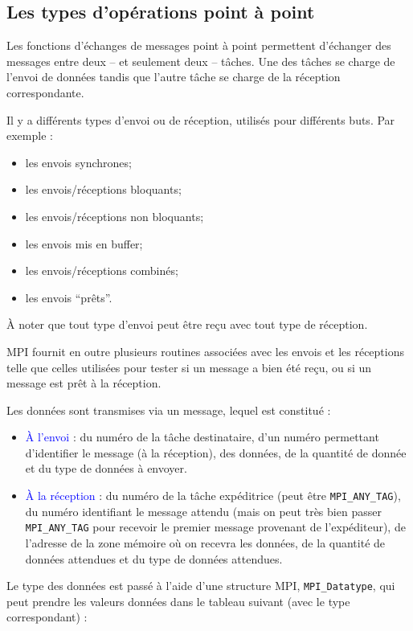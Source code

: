 \documentclass[11pt,a4paper]{article}
\begin{document}
\subsection{Les types d'opérations point à point}

Les fonctions d'échanges de messages point à point permettent d'échanger des messages
entre deux -- et seulement deux -- tâches. Une des tâches se charge de l'envoi de données
tandis que l'autre tâche se charge de la réception correspondante.

Il y a différents types d'envoi ou de réception, utilisés pour différents buts. Par exemple :
\begin{itemize}
\item les envois synchrones;
\item les envois/réceptions bloquants;
\item les envois/réceptions non bloquants;
\item les envois mis en buffer;
\item les envois/réceptions combinés;
\item les envois ``prêts''.
\end{itemize}

\`A noter que tout type d'envoi peut être reçu avec tout type de réception.

MPI fournit en outre plusieurs routines associées avec les envois et les réceptions telle que celles utilisées
pour tester si un message a bien été reçu, ou si un message est prêt à la réception.

Les données sont transmises via un message, lequel est constitué :
\begin{itemize}
\item \textcolor{blue}{\`A l'envoi} : du numéro de la tâche destinataire, d'un numéro permettant d'identifier
le message (à la réception), des données, de la quantité de donnée et du type de données à envoyer.
\item \textcolor{blue}{\`A la réception} : du numéro de la tâche expéditrice (peut être \texttt{MPI\_ANY\_TAG}), 
du numéro identifiant le message attendu
(mais on peut très bien passer \texttt{MPI\_ANY\_TAG} pour recevoir le premier message provenant de
l'expéditeur), de l'adresse de la zone mémoire où on recevra les données, de la quantité de données
attendues et du type de données attendues.
\end{itemize}

Le type des données est passé à l'aide d'une structure MPI, \texttt{MPI\_Datatype}, qui peut prendre les valeurs données dans le
tableau suivant (avec le type correspondant) :
\end{document}
